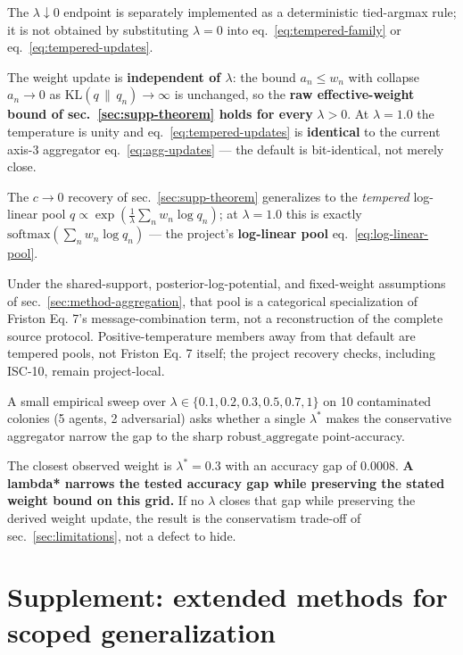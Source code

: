 \documentclass[
  english,
]{article}
\theoremstyle{plain}
\theoremstyle{definition}
\theoremstyle{remark}
\theoremstyle{definition}
\begin{document}
The \(\lambda\downarrow0\) endpoint is separately implemented as a
deterministic tied-argmax rule; it is not obtained by substituting
\(\lambda=0\) into eq.~\ref{eq:tempered-family} or
eq.~\ref{eq:tempered-updates}.

The weight update is \textbf{independent of \(\lambda\)}: the bound
\(a_n \le w_n\) with collapse \(a_n \to 0\) as
\(\mathrm{KL}(q\,\|\,q_n) \to \infty\) is unchanged, so the \textbf{raw
effective-weight bound of sec.~\ref{sec:supp-theorem} holds for every}
\(\lambda > 0\). At \(\lambda = 1.0\) the temperature is unity and
eq.~\ref{eq:tempered-updates} is \textbf{identical} to the current
axis-3 aggregator eq.~\ref{eq:agg-updates} --- the default is
bit-identical, not merely close.

The \(c \to 0\) recovery of sec.~\ref{sec:supp-theorem} generalizes to
the \emph{tempered} log-linear pool
\(q \propto \exp(\tfrac{1}{\lambda}\sum_n w_n \log q_n)\); at
\(\lambda = 1.0\) this is exactly
\(\mathrm{softmax}(\sum_n w_n \log q_n)\) --- the project's
\textbf{log-linear pool} eq.~\ref{eq:log-linear-pool}.

Under the shared-support, posterior-log-potential, and fixed-weight
assumptions of sec.~\ref{sec:method-aggregation}, that pool is a
categorical specialization of Friston Eq. 7's message-combination term,
not a reconstruction of the complete source protocol.
Positive-temperature members away from that default are tempered pools,
not Friston Eq. 7 itself; the project recovery checks, including ISC-10,
remain project-local.

A small empirical sweep over
\(\lambda \in \{ 0.1, 0.2, 0.3, 0.5, 0.7, 1 \}\) on 10 contaminated
colonies (5 agents, 2 adversarial) asks whether a single
\(\lambda^{\ast}\) makes the conservative aggregator narrow the gap to
the sharp \(\mathrm{robust\_aggregate}\) point-accuracy.

The closest observed weight is \(\lambda^{\ast} = 0.3\) with an accuracy
gap of 0.0008. \textbf{A lambda* narrows the tested accuracy gap while
preserving the stated weight bound on this grid.} If no \(\lambda\)
closes that gap while preserving the derived weight update, the result
is the conservatism trade-off of sec.~\ref{sec:limitations}, not a
defect to hide.

\section{Supplement: extended methods for scoped
generalization}\label{sec:supp-extended}
\end{document}
